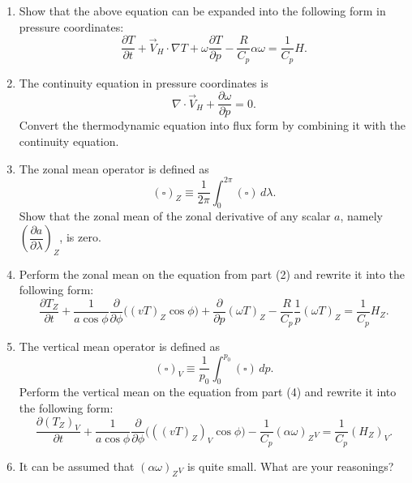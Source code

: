 \documentclass[11pt,a4paper]{article}
\begin{document}
\begin{enumerate}[label=(\arabic*)]
    \item Show that the above equation can be expanded into the following form in pressure coordinates:
    \[
        \frac{\partial T}{\partial t} + \vec{V}_H\cdot\nabla T + \omega\frac{\partial T}{\partial p} - \frac{R}{C_p}\alpha\omega = \frac{1}{C_p}H.
    \]
    \begin{solution}

    \end{solution}

    \item The continuity equation in pressure coordinates is
    \[
        \nabla\cdot\vec{V}_H + \frac{\partial \omega}{\partial p} = 0.
    \]
    Convert the thermodynamic equation into flux form by combining it with the continuity equation.
    \begin{solution}

    \end{solution}

    \item The zonal mean operator is defined as
    \[
        (\square)_Z \equiv \frac{1}{2\pi}\int_0^{2\pi} (\square)\,d\lambda.
    \]
    Show that the zonal mean of the zonal derivative of any scalar $a$, namely $\left(\dfrac{\partial a}{\partial \lambda}\right)_Z$, is zero.
    \begin{solution}

    \end{solution}

    \item Perform the zonal mean on the equation from part (2) and rewrite it into the following form:
    \[
        \frac{\partial T_Z}{\partial t}
        +
        \frac{1}{a\cos\phi}\frac{\partial}{\partial\phi}\bigl((vT)_Z\cos\phi\bigr)
        +
        \frac{\partial}{\partial p}(\omega T)_Z
        -
        \frac{R}{C_p}\frac{1}{p}(\omega T)_Z
        =
        \frac{1}{C_p}H_Z.
    \]
    \begin{solution}

    \end{solution}

    \item The vertical mean operator is defined as
    \[
        (\square)_V \equiv \frac{1}{p_0}\int_0^{p_0} (\square)\,dp.
    \]
    Perform the vertical mean on the equation from part (4) and rewrite it into the following form:
    \[
        \frac{\partial (T_Z)_V}{\partial t}
        +
        \frac{1}{a\cos\phi}\frac{\partial}{\partial\phi}\bigl(((vT)_Z)_V\cos\phi\bigr)
        -
        \frac{1}{C_p}(\alpha\omega)_Z{}_V
        =
        \frac{1}{C_p}(H_Z)_V.
    \]
    \begin{solution}

    \end{solution}

    \item It can be assumed that $(\alpha\omega)_Z{}_V$ is quite small. What are your reasonings?
    \begin{solution}

    \end{solution}
\end{enumerate}
\end{document}
